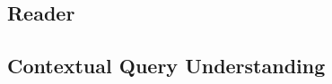 \subsection{Reader}
\label{subsec:reader}

\subsection{Contextual Query Understanding}
\label{subsec:cqu}









